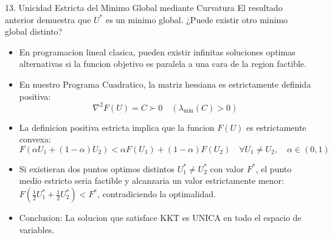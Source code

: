 \documentclass[aspectratio=169,10pt]{beamer}
\begin{document}
\begin{frame}{13. Unicidad Estricta del Minimo Global mediante Curvatura}
  El resultado anterior demuestra que $U^*$ es un minimo global. ¿Puede existir otro minimo global distinto?
  \vspace{0.3cm}
  \begin{itemize}
    \item En programacion lineal clasica, pueden existir infinitas soluciones optimas alternativas si la funcion objetivo es paralela a una cara de la region factible.
    \vspace{0.2cm}
    \item En nuestro Programa Cuadratico, la matriz hessiana es estrictamente definida positiva:
    \begin{equation*}
      \nabla^2 F(U) = C \succ 0 \quad (\lambda_{\min}(C) > 0)
    \end{equation*}
    \item La definicion positiva estricta implica que la funcion $F(U)$ es estrictamente convexa:
    \begin{equation*}
      F(\alpha U_1 + (1-\alpha) U_2) < \alpha F(U_1) + (1-\alpha) F(U_2) \quad \forall U_1 \neq U_2, \quad \alpha \in (0, 1)
    \end{equation*}
    \item Si existieran dos puntos optimos distintos $U_1^* \neq U_2^*$ con valor $F^*$, el punto medio estricto seria factible y alcanzaria un valor estrictamente menor: $F(\frac{1}{2}U_1^* + \frac{1}{2}U_2^*) < F^*$, contradiciendo la optimalidad.
    \vspace{0.2cm}
    \item Conclusion: La solucion que satisface KKT es UNICA en todo el espacio de variables.
  \end{itemize}
\end{frame}
\end{document}
